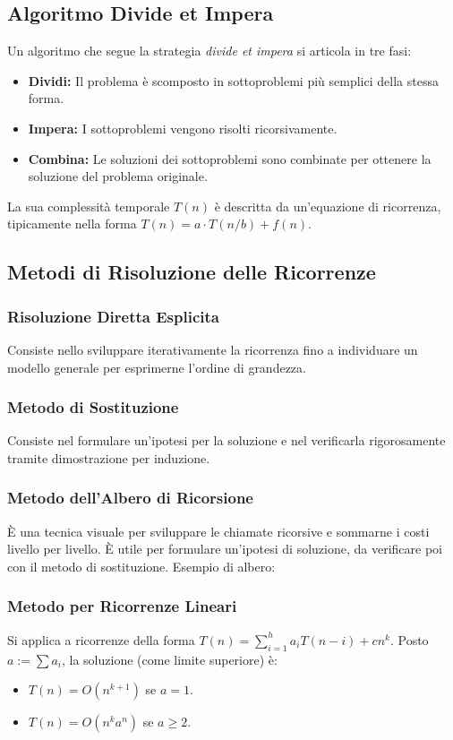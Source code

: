 \subsection{Algoritmo Divide et Impera}
Un algoritmo che segue la strategia \textit{divide et impera} si articola in tre fasi:
\begin{itemize}
    \item \textbf{Dividi:} Il problema è scomposto in sottoproblemi più semplici della stessa forma.
    \item \textbf{Impera:} I sottoproblemi vengono risolti ricorsivamente.
    \item \textbf{Combina:} Le soluzioni dei sottoproblemi sono combinate per ottenere la soluzione del problema originale.
\end{itemize}
La sua complessità temporale $T(n)$ è descritta da un'equazione di ricorrenza, tipicamente nella forma $T(n) = a \cdot T(n/b) + f(n)$.

\subsection{Metodi di Risoluzione delle Ricorrenze}

\subsubsection{Risoluzione Diretta Esplicita}
Consiste nello sviluppare iterativamente la ricorrenza fino a individuare un modello generale per esprimerne l'ordine di grandezza.

\subsubsection{Metodo di Sostituzione}
Consiste nel formulare un'ipotesi per la soluzione e nel verificarla rigorosamente tramite dimostrazione per induzione.

\subsubsection{Metodo dell'Albero di Ricorsione}
È una tecnica visuale per sviluppare le chiamate ricorsive e sommarne i costi livello per livello. È utile per formulare un'ipotesi di soluzione, da verificare poi con il metodo di sostituzione. Esempio di albero:

\subsubsection{Metodo per Ricorrenze Lineari}
Si applica a ricorrenze della forma $T(n) = \sum_{i=1}^{h} a_i T(n-i) + cn^k$. Posto $a := \sum a_i$, la soluzione (come limite superiore) è:
\begin{itemize}
    \item $T(n) = O(n^{k+1})$ se $a=1$.
    \item $T(n) = O(n^k a^n)$ se $a \ge 2$.
\end{itemize}


